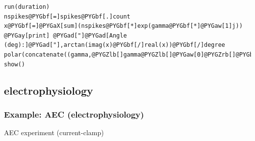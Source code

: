 \documentclass[letterpaper,10pt,english]{manual}
\begin{document}
\begin{Verbatim}[commandchars=@\[\]]
run(duration)
nspikes@PYGbf[=]spikes@PYGbf[.]count
x@PYGbf[=]@PYGaX[sum](nspikes@PYGbf[*]exp(gamma@PYGbf[*]@PYGaw[1]j))
@PYGay[print] @PYGad["]@PYGad[Angle (deg):]@PYGad["],arctan(imag(x)@PYGbf[/]real(x))@PYGbf[/]degree
polar(concatenate((gamma,@PYGZlb[]gamma@PYGZlb[]@PYGaw[0]@PYGZrb[]@PYGbf[+]@PYGaw[2]@PYGbf[*]pi@PYGZrb[])),concatenate((nspikes,@PYGZlb[]nspikes@PYGZlb[]@PYGaw[0]@PYGZrb[]@PYGZrb[]))@PYGbf[/]duration)
show()
\end{Verbatim}


\subsection{electrophysiology}

\resetcurrentobjects
\hypertarget{--doc-examples-electrophysiology_AEC}{}

\hypertarget{index-35}{}\subsubsection{Example: AEC (electrophysiology)}

AEC experiment (current-clamp)
\end{document}
